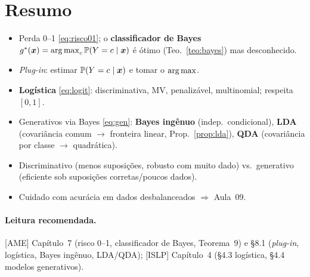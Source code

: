 \documentclass[11pt,a4paper]{article}
\begin{document}
\section*{Resumo}
\begin{itemize}[leftmargin=1.4cm]
  \item Perda 0--1 \eqref{eq:risco01}; o \textbf{classificador de Bayes}
        $g^*(\x)=\argmax_c\Prob(Y=c\mid\x)$ é ótimo (Teo.~\ref{teo:bayes}) mas
        desconhecido.
  \item \emph{Plug-in}: estimar $\mathbb{P}(Y=c\mid\bm{x})$ e tomar o $\argmax$.
  \item \textbf{Logística} \eqref{eq:logit}: discriminativa, MV, penalizável,
        multinomial; respeita $[0,1]$.
  \item Generativos via Bayes \eqref{eq:gen}: \textbf{Bayes ingênuo} (indep.\
        condicional), \textbf{LDA} (covariância comum $\to$ fronteira linear,
        Prop.~\ref{prop:lda}), \textbf{QDA} (covariância por classe $\to$
        quadrática).
  \item Discriminativo (menos suposições, robusto com muito dado) vs.\ generativo
        (eficiente sob suposições corretas/poucos dados).
  \item Cuidado com acurácia em dados desbalanceados $\Rightarrow$ Aula~09.
\end{itemize}

\paragraph{Leitura recomendada.} [AME] Capítulo~7 (risco 0--1, classificador de
Bayes, Teorema~9) e §8.1 (\emph{plug-in}, logística, Bayes ingênuo, LDA/QDA);
[ISLP] Capítulo~4 (§4.3 logística, §4.4 modelos generativos).
\end{document}
